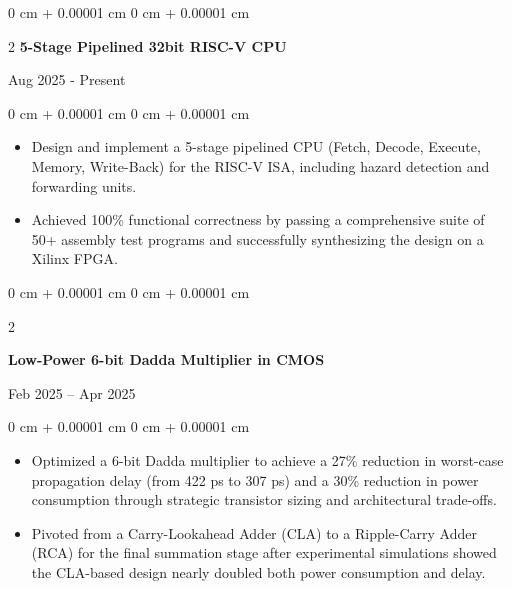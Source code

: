 \documentclass[10pt, letterpaper]{article}
\newenvironment{highlights}{
    \begin{itemize}[
        topsep=0.05 cm,
        parsep=0.05 cm,
        partopsep=0pt,
        itemsep=0pt,
        leftmargin=0 cm + 10pt
    ]
}{
    \end{itemize}
}
\newenvironment{onecolentry}{
    \begin{adjustwidth}{
        0 cm + 0.00001 cm
    }{
        0 cm + 0.00001 cm
    }
}{
    \end{adjustwidth}
}
\newenvironment{twocolentry}[2][]{
    \onecolentry
    \def\secondColumn{#2}
    \setcolumnwidth{\fill, 4.5 cm}
    \begin{paracol}{2}
}{
    \switchcolumn \raggedleft \secondColumn
    \end{paracol}
    \endonecolentry
}
\begin{document}
        \begin{twocolentry}{
            Aug 2025 - Present } \textbf{ 5-Stage Pipelined 32bit RISC-V CPU}
        \end{twocolentry}
        \vspace{0.05 cm}
        \begin{onecolentry}
            \begin{highlights}
                \item Design and implement a 5-stage pipelined CPU (Fetch, Decode, Execute, Memory, Write-Back) for the RISC-V ISA, including hazard detection and forwarding units.
                \item Achieved 100\% functional correctness by passing a comprehensive suite of 50+ assembly test programs and successfully synthesizing the design on a Xilinx FPGA.
            \end{highlights}
        \end{onecolentry}

        \vspace{0.15 cm}

        \begin{twocolentry}{
            Feb 2025 – Apr 2025
        }
            \textbf{Low-Power 6-bit Dadda Multiplier in CMOS}
        \end{twocolentry}
        \vspace{0.05 cm}
        \begin{onecolentry}
            \begin{highlights}
                \item Optimized a 6-bit Dadda multiplier to achieve a 27\% reduction in worst-case propagation delay (from 422 ps to 307 ps) and a 30\% reduction in power consumption through strategic transistor sizing and architectural trade-offs.
                \item Pivoted from a Carry-Lookahead Adder (CLA) to a Ripple-Carry Adder (RCA) for the final summation stage after experimental simulations showed the CLA-based design nearly doubled both power consumption and delay.
            \end{highlights}
        \end{onecolentry}

        \vspace{0.15 cm}
\end{document}
